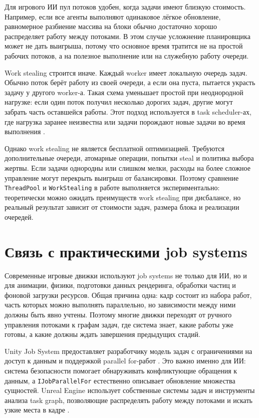 \documentclass[14pt,a4paper,oneside]{extreport}
\begin{document}
Для игрового ИИ пул потоков удобен, когда задачи имеют близкую стоимость. Например, если все агенты выполняют одинаковое лёгкое обновление, равномерное разбиение массива на блоки обычно достаточно хорошо распределяет работу между потоками. В этом случае усложнение планировщика может не дать выигрыша, потому что основное время тратится не на простой рабочих потоков, а на полезное выполнение или на служебную работу очереди.

Work stealing строится иначе. Каждый worker имеет локальную очередь задач. Обычно поток берёт работу из своей очереди, а если она пуста, пытается украсть задачу у другого worker-а. Такая схема уменьшает простой при неоднородной нагрузке: если один поток получил несколько дорогих задач, другие могут забрать часть оставшейся работы. Этот подход используется в task scheduler-ах, где нагрузка заранее неизвестна или задачи порождают новые задачи во время выполнения \cite{onetbb_scheduler}.

Однако work stealing не является бесплатной оптимизацией. Требуются дополнительные очереди, атомарные операции, попытки steal и политика выбора жертвы. Если задачи однородны или слишком мелки, расходы на более сложное управление могут перекрыть выигрыш от балансировки. Поэтому сравнение \texttt{ThreadPool} и \texttt{WorkStealing} в работе выполняется экспериментально: теоретически можно ожидать преимуществ work stealing при дисбалансе, но реальный результат зависит от стоимости задач, размера блока и реализации очередей.

\section{Связь с практическими job systems}

Современные игровые движки используют job systems не только для ИИ, но и для анимации, физики, подготовки данных рендеринга, обработки частиц и фоновой загрузки ресурсов. Общая причина одна: кадр состоит из набора работ, часть которых можно выполнять параллельно, но зависимости между ними должны быть явно учтены. Поэтому многие движки переходят от ручного управления потоками к графам задач, где система знает, какие работы уже готовы, а какие должны ждать завершения предыдущих стадий.

Unity Job System предоставляет разработчику модель задач с ограничениями на доступ к данным и поддержкой parallel for-работ \cite{unity_job_system,unity_parallel_for_jobs}. Это важно именно для ИИ: система безопасности помогает обнаруживать конфликтующие обращения к данным, а \texttt{IJobParallelFor} естественно описывает обновление множества сущностей. Unreal Engine использует собственные системы задач и инструменты анализа task graph, позволяющие распределять работу между потоками и искать узкие места в кадре \cite{unreal_tasks_system,unreal_task_graph_insights}.
\end{document}

